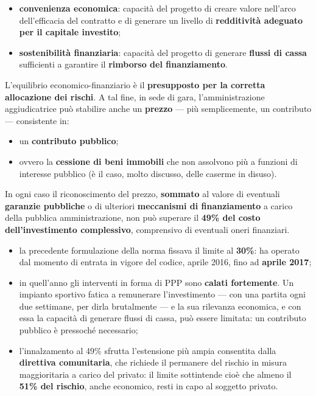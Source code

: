 \begin{itemize}
  \item \textbf{convenienza economica}: capacità del progetto di creare valore nell'arco
    dell'efficacia del contratto e di generare un livello di \textbf{redditività adeguato per il
    capitale investito};
  \item \textbf{sostenibilità finanziaria}: capacità del progetto di generare \textbf{flussi di
    cassa} sufficienti a garantire il \textbf{rimborso del finanziamento}.
\end{itemize}


L'equilibrio economico-finanziario è il \textbf{presupposto per la corretta allocazione dei
rischi}. A tal fine, in sede di gara, l'amministrazione aggiudicatrice può stabilire anche un
\textbf{prezzo} --- più semplicemente, un contributo --- consistente in:

\begin{itemize}
  \item un \textbf{contributo pubblico};
  \item ovvero la \textbf{cessione di beni immobili} che non assolvono più a funzioni di interesse
    pubblico (è il caso, molto discusso, delle caserme in disuso).
\end{itemize}

In ogni caso il riconoscimento del prezzo, \textbf{sommato} al valore di eventuali \textbf{garanzie
pubbliche} o di ulteriori \textbf{meccanismi di finanziamento} a carico della pubblica
amministrazione, non può superare il \textbf{49\% del costo dell'investimento complessivo},
comprensivo di eventuali oneri finanziari.

\begin{itemize}
  \item la precedente formulazione della norma fissava il limite al \textbf{30\%}: ha operato dal
    momento di entrata in vigore del codice, aprile 2016, fino ad \textbf{aprile 2017};
  \item in quell'anno gli interventi in forma di PPP sono \textbf{calati fortemente}. Un impianto
    sportivo fatica a remunerare l'investimento --- con una partita ogni due settimane, per dirla
    brutalmente --- e la sua rilevanza economica, e con essa la capacità di generare flussi di
    cassa, può essere limitata: un contributo pubblico è pressoché necessario;
  \item l'innalzamento al 49\% sfrutta l'estensione più ampia consentita dalla \textbf{direttiva
    comunitaria}, che richiede il permanere del rischio in misura maggioritaria a carico del
    privato: il limite sottintende cioè che almeno il \textbf{51\% del rischio}, anche economico,
    resti in capo al soggetto privato.
\end{itemize}

